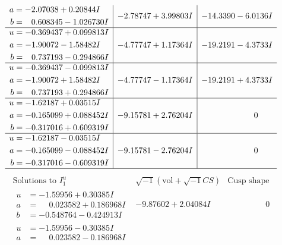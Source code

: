 \documentclass[1p]{elsarticle_modified}
\theoremstyle{definition}
\newcommand{\I}{\sqrt{-1}}
\begin{document}
$$\begin{array}{c|c|c}
\begin{aligned}
a &= -2.07038 + 0.20844 I \\
b &= \phantom{-}0.608345 - 1.026730 I\end{aligned}
 & -2.78747 + 3.99803 I & -14.3390 - 6.0136 I \\ \hline\begin{aligned}
u &= -0.369437 + 0.099813 I \\
a &= -1.90072 - 1.58482 I \\
b &= \phantom{-}0.737193 - 0.294866 I\end{aligned}
 & -4.77747 + 1.17364 I & -19.2191 - 4.3733 I \\ \hline\begin{aligned}
u &= -0.369437 - 0.099813 I \\
a &= -1.90072 + 1.58482 I \\
b &= \phantom{-}0.737193 + 0.294866 I\end{aligned}
 & -4.77747 - 1.17364 I & -19.2191 + 4.3733 I \\ \hline\begin{aligned}
u &= -1.62187 + 0.03515 I \\
a &= -0.165099 + 0.088452 I \\
b &= -0.317016 + 0.609319 I\end{aligned}
 & -9.15781 + 2.76204 I & \phantom{-0.000000 } 0 \\ \hline\begin{aligned}
u &= -1.62187 - 0.03515 I \\
a &= -0.165099 - 0.088452 I \\
b &= -0.317016 - 0.609319 I\end{aligned}
 & -9.15781 - 2.76204 I & \phantom{-0.000000 } 0\\
 \hline 
 \end{array}$$\newpage$$\begin{array}{c|c|c}  
\text{Solutions to }I^u_{1}& \I (\text{vol} + \sqrt{-1}CS) & \text{Cusp shape}\\
 \hline 
\begin{aligned}
u &= -1.59956 + 0.30385 I \\
a &= \phantom{-}0.023582 + 0.186968 I \\
b &= -0.548764 - 0.424913 I\end{aligned}
 & -9.87602 + 2.04084 I & \phantom{-0.000000 } 0 \\ \hline\begin{aligned}
u &= -1.59956 - 0.30385 I \\
a &= \phantom{-}0.023582 - 0.186968 I \\

\end{aligned}
\end{array}$$
\end{document}
